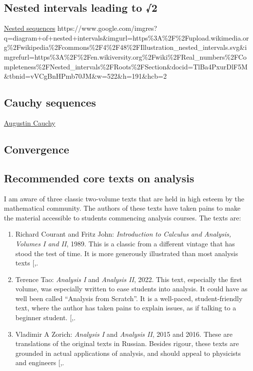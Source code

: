 \documentclass[
  a4paper,
]{article}
\begin{document}
\subsection{Nested intervals leading to
√2}\label{nested-intervals-leading-to-2}

\href{https://en.wikipedia.org/wiki/Nested_intervals}{Nested sequences}
https://www.google.com/imgres?q=diagram+of+nested+intervals\&imgurl=https\%3A\%2F\%2Fupload.wikimedia.org\%2Fwikipedia\%2Fcommons\%2F4\%2F48\%2FIllustration\_nested\_intervals.svg\&imgrefurl=https\%3A\%2F\%2Fen.wikiversity.org\%2Fwiki\%2FReal\_numbers\%2FCompleteness\%2FNested\_intervals\%2FRoots\%2FSection\&docid=TlBa4PxurDlF5M\&tbnid=vVCgBnHPmb70JM\&w=522\&h=191\&hcb=2

\subsection{Cauchy sequences}\label{cauchy-sequences-1}

\href{https://en.wikipedia.org/wiki/Augustin-Louis_Cauchy}{Augustin
Cauchy}

\subsection{Convergence}\label{convergence}

\subsection{Recommended core texts on
analysis}\label{recommended-core-texts-on-analysis}

I am aware of three classic two-volume texts that are held in high
esteem by the mathematical community. The authors of these texts have
taken pains to make the material accessible to students commencing
analysis courses. The texts are:

\begin{enumerate}
\def\labelenumi{\arabic{enumi}.}
\item
  Richard Courant and Fritz John: \emph{Introduction to Calculus and
  Analysis, Volumes I and II}, 1989. This is a classic from a different
  vintage that has stood the test of time. It is more generously
  illustrated than most analysis texts
  {[},\citeproc{ref-courant-john-two}{5}{]}.
\item
  Terence Tao: \emph{Analysis I} and \emph{Analysis II}, 2022. This
  text, especially the first volume, was especially written to ease
  students into analysis. It could have as well been called ``Analysis
  from Scratch''. It is a well-paced, student-friendly text, where the
  author has taken pains to explain issues, as if talking to a beginner
  student.
  {[},\citeproc{ref-tao-two-2022}{7}{]}.
\item
  Vladimir A Zorich: \emph{Analysis I} and \emph{Analysis II}, 2015 and
  2016. These are translations of the original texts in Russian. Besides
  rigour, these texts are grounded in actual applications of analysis,
  and should appeal to physicists and engineers
  {[},\citeproc{ref-zorich-two-2016}{9}{]}.
\end{enumerate}
\end{document}
